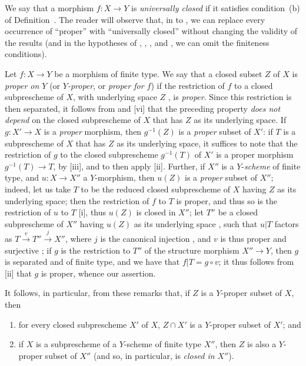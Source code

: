 \begin{remark}[5.4.9]
\label{II.5.4.9}
We say that a morphism $f:X\to Y$ is \emph{universally closed} if it satisfies condition~(b) of Definition~.
The reader will observe that,
in  to , we can replace every occurrence of ``proper'' with ``universally closed'' without changing the validity of the results (and in the hypotheses of , , , and , we can omit the finiteness conditions).
\end{remark}

\begin{env}[5.4.10]
\label{II.5.4.10}
Let $f:X\to Y$ be a morphism of finite type.
We say that a closed subset $Z$ of $X$ is \emph{proper on $Y$} (or \emph{$Y$-proper}, or \emph{proper for $f$}) if the restriction of $f$ to a closed subprescheme of $X$, with underlying space $Z$ , is \emph{proper}.
Since this restriction is then separated, it follows from  and [vi] that the preceding property \emph{does not depend} on the closed subprescheme of $X$ that has $Z$ as its underlying space.
If $g:X'\to X$ is a \emph{proper} morphism, then $g^{-1}(Z)$ is a \emph{proper} subset of $X'$:
if $T$ is a subprescheme of $X$ that has $Z$ as its underlying space, it suffices to note that the restriction of $g$ to the closed subprescheme $g^{-1}(T)$ of $X'$ is a proper morphism $g^{-1}(T)\to T$, by [iii], and to then apply [ii].
Further, if $X''$ is a $Y$-\emph{scheme} of finite type, and $u:X\to X''$ a $Y$-morphism, then $u(Z)$ is a \emph{proper} subset of $X''$;
indeed, let us take $T$ to be the reduced closed subprescheme of $X$ having $Z$ as its underlying space;
then the restriction of $f$ to $T$ is proper, and thus so is the restriction of $u$ to $T$ [i], thus $u(Z)$ is closed in $X''$;
let $T''$ be a closed subprescheme of $X''$ having $u(Z)$ as its underlying space , such that $u|T$ factors as $T\xrightarrow{v}T''\xrightarrow{j}X''$, where $j$ is the canonical injection , and $v$ is thus proper and surjective ;
if $g$ is the restriction to $T''$ of the structure morphism $X''\to Y$, then $g$ is separated and of finite type, and we have that $f|T=g\circ v$;
it thus follows from [ii] that $g$ is proper, whence our assertion.
\end{env}

It follows, in particular, from these remarks that, if $Z$ is a $Y$-proper subset of $X$, then
\begin{enumerate}
  \item for every closed subprescheme $X'$ of $X$, $Z\cap X'$ is a $Y$-proper subset of $X'$; and
  \item if $X$ is a subprescheme of a $Y$-scheme of finite type $X''$, then $Z$ is also a $Y$-proper subset of $X''$ (and so, in particular, is \emph{closed in $X''$}).
\end{enumerate}

